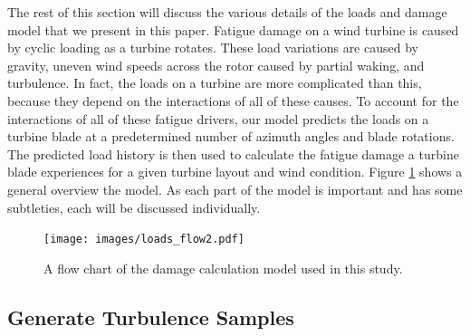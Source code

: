 \documentclass[11pt,letterpaper]{article}
\begin{document}
The rest of this section will discuss the various details of the loads and damage model that we present in this paper. 
Fatigue damage on a wind turbine is caused by cyclic loading as a turbine rotates. These load variations are caused by gravity, uneven wind speeds across the rotor caused by partial waking, and turbulence. In fact, the loads on a turbine are more complicated than this, because they depend on the interactions of all of these causes.
To account for the interactions of all of these fatigue drivers, our model predicts the loads on a turbine blade at a predetermined number of azimuth angles and blade rotations. The predicted load history is then used to calculate the fatigue damage a turbine blade experiences for a given turbine layout and wind condition.
Figure \ref{flow-chart} shows a general overview the model. As each part of the model is important and has some subtleties, each will be discussed individually.

% 
\begin{figure}
    \centering
    \texttt{[image: images/loads\_flow2.pdf]}
    \caption{A flow chart of the damage calculation model used in this study.}
    \label{flow-chart}
\end{figure}

\subsection{Generate Turbulence Samples}

\end{document}
